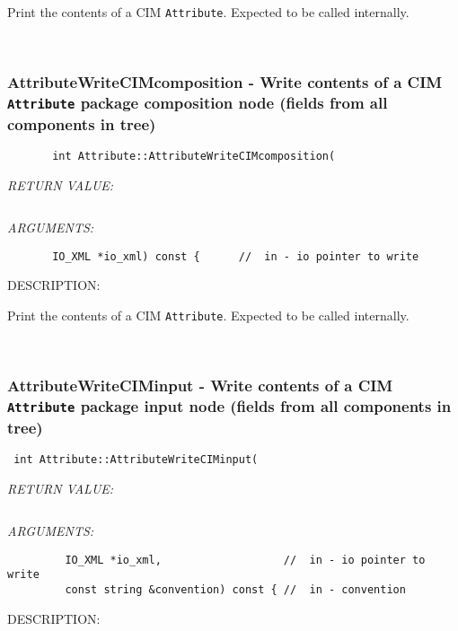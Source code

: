       Print the contents of a CIM {\tt Attribute}.  Expected to be
      called internally.
   
 
\mbox{}\hrulefill\
 
\subsubsection [AttributeWriteCIMcomposition] {AttributeWriteCIMcomposition - Write contents of a CIM {\tt Attribute} package composition node (fields from all components in tree)}


  
\begin{verbatim}       int Attribute::AttributeWriteCIMcomposition(\end{verbatim}{\em RETURN VALUE:}
\begin{verbatim} \end{verbatim}{\em ARGUMENTS:}
\begin{verbatim}       IO_XML *io_xml) const {      //  in - io pointer to write\end{verbatim}
{\sf DESCRIPTION:\\ }


      Print the contents of a CIM {\tt Attribute}.  Expected to be
      called internally.
   
 
\mbox{}\hrulefill\
 
\subsubsection [AttributeWriteCIMinput] {AttributeWriteCIMinput - Write contents of a CIM {\tt Attribute} package input node (fields from all components in tree)}


  
\begin{verbatim} int Attribute::AttributeWriteCIMinput(\end{verbatim}{\em RETURN VALUE:}
\begin{verbatim} \end{verbatim}{\em ARGUMENTS:}
\begin{verbatim}         IO_XML *io_xml,                   //  in - io pointer to write
         const string &convention) const { //  in - convention\end{verbatim}
{\sf DESCRIPTION:\\ }


